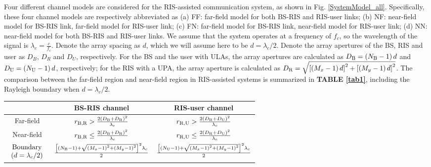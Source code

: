 \documentclass[lettersize, journal]{IEEEtran}
\begin{document}
Four different channel models are considered for the RIS-assisted communication system, as shown in Fig. {\ref{SystemModel_all}}.
Specifically, these four channel models are respectively abbreviated as (a) FF: far-field model for both BS-RIS and RIS-user links; (b) NF: near-field model for BS-RIS link, far-field model for RIS-user link; (c) FN: far-field model for BS-RIS link, near-field model for RIS-user link; (d) NN: near-field model for both BS-RIS and RIS-user links.
We assume that the system operates at a frequency of $f_c$, so the wavelength of the signal is $\lambda_c = \frac{c}{f_c}$. 
Denote the array spacing as $d$, which we will assume here to be $d = \lambda_c/2$. 
Denote the array apertures of the BS, RIS and user as $D_B$, $D_R$ and $D_U$, respectively.
For the BS and the user with ULAs, the array apertures are calculated as $D_{\rm{B}} = \left(N_{\rm{B}}-1\right)d$ and $D_{\rm{U}} = \left(N_{\rm{U}}-1\right)d$,  respectively; for the RIS with a UPA, the array aperture is calculated as $D_{\rm{R}} = \sqrt{\left[\left(M_x-1\right)d\right]^2 + \left[\left(M_y-1\right)d\right]^2}$.
The comparison between the far-field region and near-field region in RIS-assisted systems is summarized in {\bf{TABLE} {\ref{tab1}}}, including the Rayleigh boundary when $d = \lambda_c/2$.

\begin{table*}[!t]
  \caption{Comparison between the far-field and near-field regions in RIS-assisted systems}
  \begin{center}
  \begin{tabular}{|c|c|c|}
  \hline
  \rule{0pt}{9pt}
   & BS-RIS channel & RIS-user channel \\
  \hline
  \rule{0pt}{9pt}
  Far-field & $r_{{\rm{B}}, {\rm{R}}}  > \frac{2 \left(D_{\rm{B}} + D_{\rm{R}}\right)^2 }{\lambda_c}$ & $ r_{{\rm{R}}, {\rm{U}}}  >  \frac{2 \left( D_{\rm{R}} + D_{\rm{U}} \right)^2 }{\lambda_c}$  \\
  \hline
  \rule{0pt}{9pt}
  Near-field & $ r_{{\rm{B}}, {\rm{R}}}  \le \frac{2 \left(D_{\rm{B}} + D_{\rm{R}}\right)^2 }{\lambda_c}$ & $ r_{{\rm{R}}, {\rm{U}}}  \le  \frac{2 \left( D_{\rm{R}} + D_{\rm{U}} \right)^2 }{\lambda_c}$  \\  
  \hline
  \rule{0pt}{9pt}
  $\begin{array}{cc}
        \rm{Boundary} \\
        \left(d = \lambda_c/2 \right) \\
  \end{array}$     &  $\frac{\left[ \left(N_{\rm{B}}-1\right) + \sqrt{\left(M_x-1\right)^2 + \left(M_y-1\right)^2} \right]^2{\lambda_c}}{2}$ & $\frac{\left[ \left(N_{\rm{U}}-1\right) + \sqrt{\left(M_x-1\right)^2 + \left(M_y-1\right)^2} \right]^2{\lambda_c}}{2}$ \\   
  \hline
   \end{tabular}
  \label{tab1}
  \end{center}
\end{table*}
\end{document}

